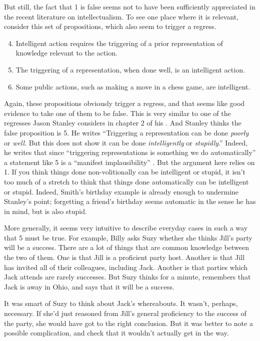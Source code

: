 But still, the fact that 1 is false seems not to have been sufficiently appreciated in the recent literature on intellectualism. To see one place where it is relevant, consider this set of propositions, which also seem to trigger a regress.
\begin{enumerate}
\setcounter{enumi}{3}
\item Intelligent action requires the triggering of a prior representation of knowledge relevant to the action.
\item The triggering of a representation, when done well, is an intelligent action.
\item Some public actions, such as making a move in a chess game, are intelligent.
\end{enumerate}
%
Again, these propositions obviously trigger a regress, and that seems like good evidence to take one of them to be false. This is very similar to one of the regresses Jason Stanley considers in chapter 2 of his \citeyearpar{Stanley2011}. And Stanley thinks the false proposition is 5. He writes ``Triggering a representation can be done \emph{poorly} or \emph{well}. But this does not show it can be done \emph{intelligently} or \emph{stupidly}.'' \citep[16]{Stanley2011} Indeed, he writes that since ``triggering representations is something we do automatically'' \citep[16]{Stanley2011} a statement like 5 is a ``manifest implausibility'' \citep[16]{Stanley2011}. But the argument here relies on 1. If you think things done non-volitionally can be intelligent or stupid, it isn't too much of a stretch to think that things done automatically can be intelligent or stupid. Indeed, Smith's birthday example is already enough to undermine Stanley's point; forgetting a friend's birthday seems automatic in the sense he has in mind, but is also stupid.

More generally, it seems very intuitive to describe everyday cases in such a way that 5 must be true. For example, Billy asks Suzy whether she thinks Jill's party will be a success. There are a lot of things that are common knowledge between the two of them. One is that Jill is a proficient party host. Another is that Jill has invited all of their colleagues, including Jack. Another is that parties which Jack attends are rarely successes. But Suzy thinks for a minute, remembers that Jack is away in Ohio, and says that it will be a success.

It was smart of Suzy to think about Jack's whereabouts. It wasn't, perhaps, necessary. If she'd just reasoned from Jill's general proficiency to the success of the party, she would have got to the right conclusion. But it was better to note a possible complication, and check that it wouldn't actually get in the way. 


